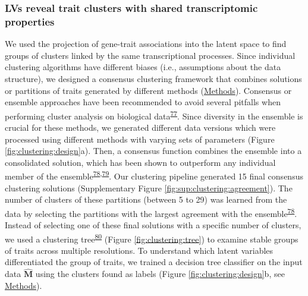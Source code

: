 \documentclass[
  a4paper,
]{article}
\begin{document}
\hypertarget{lvs-reveal-trait-clusters-with-shared-transcriptomic-properties}{%
\subsubsection{LVs reveal trait clusters with shared transcriptomic properties}\label{lvs-reveal-trait-clusters-with-shared-transcriptomic-properties}}

We used the projection of gene-trait associations into the latent space to find groups of clusters linked by the same transcriptional processes.
Since individual clustering algorithms have different biases (i.e., assumptions about the data structure), we designed a consensus clustering framework that combines solutions or partitions of traits generated by different methods (\protect\hyperlink{sec:methods:clustering}{Methods}).
Consensus or ensemble approaches have been recommended to avoid several pitfalls when performing cluster analysis on biological data\textsuperscript{\protect\hyperlink{ref-14dCeRkua}{77}}.
Since diversity in the ensemble is crucial for these methods, we generated different data versions which were processed using different methods with varying sets of parameters (Figure \ref{fig:clustering:design}a).
Then, a consensus function combines the ensemble into a consolidated solution, which has been shown to outperform any individual member of the ensemble\textsuperscript{\protect\hyperlink{ref-uw3AnEgA}{78},\protect\hyperlink{ref-cuROQDFa}{79}}.
Our clustering pipeline generated 15 final consensus clustering solutions (Supplementary Figure \ref{fig:sup:clustering:agreement}).
The number of clusters of these partitions (between 5 to 29) was learned from the data by selecting the partitions with the largest agreement with the ensemble\textsuperscript{\protect\hyperlink{ref-uw3AnEgA}{78}}.
Instead of selecting one of these final solutions with a specific number of clusters, we used a clustering tree\textsuperscript{\protect\hyperlink{ref-xhtEAzx6}{80}} (Figure \ref{fig:clustering:tree}) to examine stable groups of traits across multiple resolutions.
To understand which latent variables differentiated the group of traits, we trained a decision tree classifier on the input data \(\hat{\mathbf{M}}\) using the clusters found as labels (Figure \ref{fig:clustering:design}b, see \protect\hyperlink{sec:methods:clustering}{Methods}).
\end{document}
